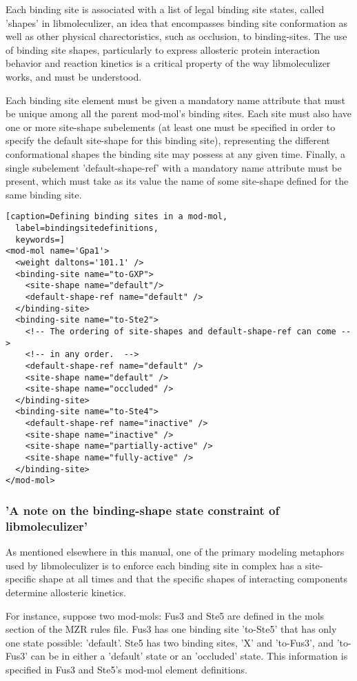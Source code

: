 Each binding site is associated with a list of legal binding
site states, called 'shapes' in libmoleculizer, an idea that
encompasses binding site conformation as well as other physical
charectoristics, such as occlusion, to binding-sites.  The use of
binding site shapes, particularly to express allosteric protein
interaction behavior and reaction kinetics is a critical property of
the way libmoleculizer works, and must be understood.  

Each binding site element must be given a mandatory name attribute
that must be unique among all the parent mod-mol's binding sites. Each
site must also have one or more site-shape subelements (at least one must be
specified in order to specify the default site-shape for this binding
site), representing the different conformational shapes the binding
site may possess at any given time.  Finally, a single subelement
'default-shape-ref' with a mandatory name attribute must be present,
which must take as its value the name of some site-shape defined for
the same binding site.

\lstset{language=XML}
\begin{lstlisting}[caption=Defining binding sites in a mod-mol,
  label=bindingsitedefinitions,
  keywords=]
<mod-mol name='Gpa1'>
  <weight daltons='101.1' />
  <binding-site name="to-GXP">
    <site-shape name="default"/>
    <default-shape-ref name="default" />
  </binding-site>
  <binding-site name="to-Ste2">
    <!-- The ordering of site-shapes and default-shape-ref can come -->
    <!-- in any order.  -->
    <default-shape-ref name="default" />
    <site-shape name="default" />
    <site-shape name="occluded" />
  </binding-site>
  <binding-site name="to-Ste4">
    <default-shape-ref name="inactive" />
    <site-shape name="inactive" />
    <site-shape name="partially-active" />
    <site-shape name="fully-active" />
  </binding-site>
</mod-mol>
\end{lstlisting}


\subsubsection{'A note on the binding-shape state constraint of
  libmoleculizer'}
As mentioned elsewhere in this manual, one of the primary modeling
metaphors used by libmoleculizer is to enforce each binding site in
complex has a site-specific shape at all times and that the specific
shapes of interacting components determine allosteric kinetics.  

For instance, suppose two mod-mols: Fus3 and Ste5 are defined in the
mols section of the MZR rules file.  Fus3 has one binding site
'to-Ste5' that has only one state possible: 'default'.  Ste5 has two
binding sites, 'X' and 'to-Fus3', and 'to-Fus3' can be in either a
'default' state or an 'occluded' state.  This information is specified
in Fus3 and Ste5's mod-mol element definitions.


